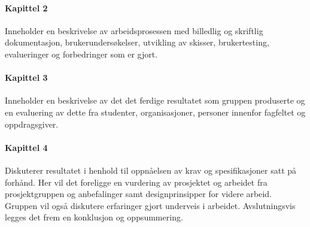 \paragraph{Kapittel 2} Inneholder en beskrivelse av arbeidsprosessen med billedlig og skriftlig dokumentasjon, brukerundersøkelser, utvikling av skisser, brukertesting, evalueringer og forbedringer som er gjort.

\paragraph{Kapittel 3}
Inneholder en beskrivelse av det det ferdige resultatet som gruppen produserte og en evaluering av dette fra studenter, organisasjoner, personer innenfor fagfeltet og oppdragsgiver.

\paragraph{Kapittel 4}
Diskuterer resultatet i henhold til oppnåelsen av krav og spesifikasjoner satt på forhånd. Her vil det foreligge en vurdering av prosjektet og arbeidet fra prosjektgruppen og anbefalinger samt designprinsipper for videre arbeid. Gruppen vil også diskutere erfaringer gjort underveis i arbeidet. Avslutningsvis legges det frem en konklusjon og oppsummering.

